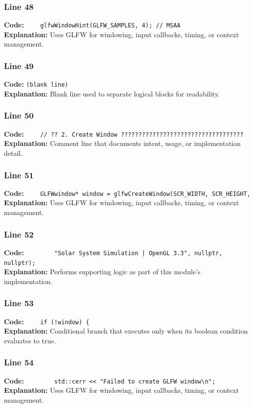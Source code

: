 \documentclass[11pt,a4paper]{article}
\begin{document}
\subsubsection*{Line 48}
\textbf{Code:} \verb|    glfwWindowHint(GLFW_SAMPLES, 4); // MSAA|\\
\textbf{Explanation:} Uses GLFW for windowing, input callbacks, timing, or context management.

\subsubsection*{Line 49}
\textbf{Code:} \texttt{(blank line)}\\
\textbf{Explanation:} Blank line used to separate logical blocks for readability.

\subsubsection*{Line 50}
\textbf{Code:} \verb|    // ?? 2. Create Window ???????????????????????????????????|\\
\textbf{Explanation:} Comment line that documents intent, usage, or implementation detail.

\subsubsection*{Line 51}
\textbf{Code:} \verb|    GLFWwindow* window = glfwCreateWindow(SCR_WIDTH, SCR_HEIGHT,|\\
\textbf{Explanation:} Uses GLFW for windowing, input callbacks, timing, or context management.

\subsubsection*{Line 52}
\textbf{Code:} \verb!        "Solar System Simulation | OpenGL 3.3", nullptr, nullptr);!\\
\textbf{Explanation:} Performs supporting logic as part of this module's implementation.

\subsubsection*{Line 53}
\textbf{Code:} \verb|    if (!window) {|\\
\textbf{Explanation:} Conditional branch that executes only when its boolean condition evaluates to true.

\subsubsection*{Line 54}
\textbf{Code:} \verb|        std::cerr << "Failed to create GLFW window\n";|\\
\textbf{Explanation:} Uses GLFW for windowing, input callbacks, timing, or context management.
\end{document}
